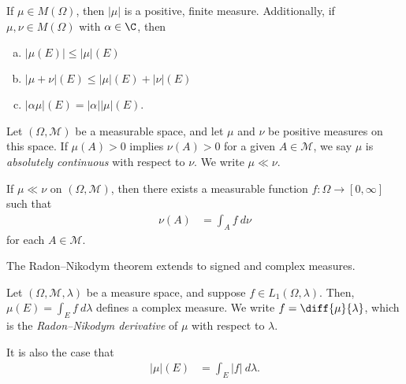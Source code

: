 \begin{fact}
  If $\mu\in M\left(\Omega\right)$, then $\left\vert \mu \right\vert$ is a positive, finite measure. Additionally, if $\mu,\nu\in M\left(\Omega\right)$ with $\alpha\in \C$, then
  \begin{enumerate}[(a)]
    \item $\left\vert \mu\left(E\right) \right\vert\leq \left\vert \mu \right\vert\left(E\right)$
    \item $\left\vert \mu + \nu \right\vert\left(E\right) \leq \left\vert \mu \right\vert\left(E\right) + \left\vert \nu \right\vert\left(E\right)$
    \item $\left\vert \alpha\mu \right\vert\left(E\right) = \left\vert \alpha \right\vert\left\vert \mu \right\vert\left(E\right)$.
  \end{enumerate}
\end{fact}
\begin{definition}
  Let $\left(\Omega,\mathcal{M}\right)$ be a measurable space, and let $\mu$ and $\nu$ be positive measures on this space. If $\mu(A) > 0$ implies $\nu(A) > 0$ for a given $A\in \mathcal{M}$, we say $\mu$ is \textit{absolutely continuous} with respect to $\nu$. We write $\mu \ll \nu$.
\end{definition}
\begin{theorem}
  If $\mu \ll \nu$ on $\left(\Omega,\mathcal{M}\right)$, then there exists a measurable function $f\colon \Omega\rightarrow [0,\infty]$ such that
  \begin{align*}
    \nu(A) &= \int_{A}^{} f \:d\nu
  \end{align*}
  for each $A\in \mathcal{M}$.
\end{theorem}
\begin{remark}
The Radon--Nikodym theorem extends to signed and complex measures.
\end{remark}
\begin{fact}
  Let $\left(\Omega,\mathcal{M},\lambda\right)$ be a measure space, and suppose $f\in L_{1}\left(\Omega,\lambda\right)$. Then, $\mu\left(E\right) = \int_{E}^{} f\:d\lambda$ defines a complex measure. We write $f = \diff{\mu}{\lambda}$, which is the \textit{Radon--Nikodym derivative} of $\mu$ with respect to $\lambda$.\newline

  It is also the case that
  \begin{align*}
    \left\vert \mu \right\vert\left(E\right) &= \int_{E}^{} \left\vert f \right\vert\:d\lambda.
  \end{align*}
\end{fact}
